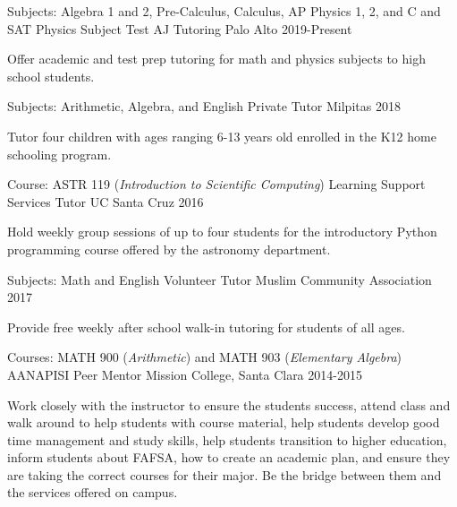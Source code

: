\begin{cventries}
	
  \cventry
	{Subjects: Algebra 1 and 2, Pre-Calculus, Calculus, AP Physics 1, 2, and C and SAT Physics Subject Test}
	{AJ Tutoring \vspace{1mm}}
	{Palo Alto}
	{2019-Present}
	{
	\vspace{0.1cm}
	\begin{cvitems}
		\item {Offer academic and test prep tutoring for math and physics subjects to high school students.}
	\end{cvitems}
	}	
  \cventry
	{Subjects: Arithmetic, Algebra, and English}
	{Private Tutor \vspace{1mm}}
	{Milpitas}
	{2018}
	{
		\vspace{0.1cm}
		\begin{cvitems}
			\item {Tutor four children with ages ranging 6-13 years old enrolled in the K12 home schooling program.}
		\end{cvitems}
	}
  \cventry
    {Course: ASTR 119 (\textit{Introduction to Scientific Computing})}
    {Learning Support Services Tutor\vspace{1mm}}
    {UC Santa Cruz}
    {2016}
    {
    \vspace{0.1cm}
      \begin{cvitems}
        \item {Hold weekly group sessions of up to four students for the introductory Python programming course offered by the astronomy department.}
      \end{cvitems}
    }

  \cventry
	{Subjects: Math and English}
	{Volunteer Tutor}
	{Muslim Community Association}
	{2017}
	{
		\vspace{0.1cm}
		\begin{cvitems}
			\item {Provide free weekly after school walk-in tutoring for students of all ages.}
		\end{cvitems}
	}

  \cventry
	{Courses: MATH 900 (\textit{Arithmetic}) and MATH 903 (\textit{Elementary Algebra})}
	{AANAPISI Peer Mentor}
	{Mission College, Santa Clara}
	{2014-2015}
	{
		\vspace{0.1cm}
		\begin{cvitems}
			\item {Work closely with the instructor to ensure the students success, attend class and walk around to help students with course material, help students develop good time management and study skills, help students transition to higher education, inform students about FAFSA, how to create an academic plan, and ensure they are taking the correct courses for their major. Be the bridge between them and the services offered on campus.}
		\end{cvitems}
	}
  

\end{cventries}
